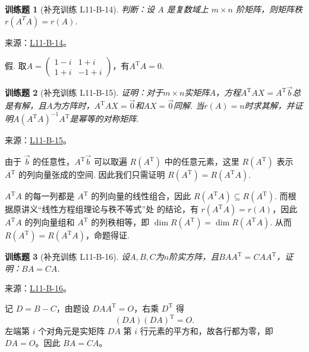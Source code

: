 \documentclass[12pt,fontset=fandol]{ctexart}
\newtheorem{exercise}{训练题}[section]
\begin{document}
\begin{exercise}[补充训练 L11-B-14]\label{prob:L11-B-14}
判断：设 $A$ 是复数域上 $m \times n$ 阶矩阵，则矩阵秩 $r\left(A^T A\right)=r(A)$.
\end{exercise}
\noindent 来源：\href{https://github.com/yhwu-is/Linear-Algebra-Left-Undone/blob/new/%E8%AE%B2%E4%B9%89/%E4%B8%93%E9%A2%98/11%20%E6%9C%9D%E8%8A%B1%E5%A4%95%E6%8B%BE.tex}{L11-B-14}。
\begin{solve}
假. 取$A=\begin{pmatrix}
                1-i & 1+i  \\
                1+i & -1+i
            \end{pmatrix}$，有$A^\mathrm{T}A=0$.
\end{solve}

\begin{exercise}[补充训练 L11-B-15]\label{prob:L11-B-15}
证明：对于$m \times n$实矩阵$A$，方程$A^\mathrm{T}AX = A^\mathrm{T}\vec{b}$总是有解，且$A$为方阵时，$A^\mathrm{T}AX = \vec{0}$和$AX=\vec{0}$同解. 当$r(A)=n$时求其解，并证明$A(A^\mathrm{T}A)^{-1}A^\mathrm{T}$是幂等的对称矩阵.
\end{exercise}
\noindent 来源：\href{https://github.com/yhwu-is/Linear-Algebra-Left-Undone/blob/new/%E8%AE%B2%E4%B9%89/%E4%B8%93%E9%A2%98/11%20%E6%9C%9D%E8%8A%B1%E5%A4%95%E6%8B%BE.tex}{L11-B-15}。
\begin{solve}
由于 $\vec{b}$ 的任意性，$A^\mathrm{T}\vec{b}$ 可以取遍 $R(A^\mathrm{T})$ 中的任意元素，这里 $R(A^\mathrm{T})$ 表示 $A^\mathrm{T}$ 的列向量张成的空间. 因此我们只需证明 $R(A^\mathrm{T}) = R(A^\mathrm{T}A)$.

            $A^\mathrm{T}A$ 的每一列都是 $A^\mathrm{T}$ 的列向量的线性组合，因此 $R(A^\mathrm{T}A) \subseteq R(A^\mathrm{T})$. 而根据原讲义“线性方程组理论与秩不等式”处 的结论，有 $r(A^\mathrm{T}A) = r(A)$，因此 $A^\mathrm{T}A$ 的列向量组和 $A^\mathrm{T}$ 的列秩相等，即 $\dim R(A^\mathrm{T}) = \dim R(A^\mathrm{T}A)$. 从而 $R(A^\mathrm{T}) = R(A^\mathrm{T}A)$，命题得证.
\end{solve}

\begin{exercise}[补充训练 L11-B-16]\label{prob:L11-B-16}
设$A,B,C$为$n$阶实方阵，且$BAA^\mathrm{T}=CAA^\mathrm{T}$，证明：$BA=CA$.
\end{exercise}
\noindent 来源：\href{https://github.com/yhwu-is/Linear-Algebra-Left-Undone/blob/new/%E8%AE%B2%E4%B9%89/%E4%B8%93%E9%A2%98/11%20%E6%9C%9D%E8%8A%B1%E5%A4%95%E6%8B%BE.tex}{L11-B-16}。
\begin{solve}
记 $D=B-C$，由题设 $DAA^{\mathrm T}=O$，右乘 $D^{\mathrm T}$ 得
\[(DA)(DA)^{\mathrm T}=O.\]
左端第 $i$ 个对角元是实矩阵 $DA$ 第 $i$ 行元素的平方和，故各行都为零，即 $DA=O$。因此 $BA=CA$。
\end{solve}
\end{document}
